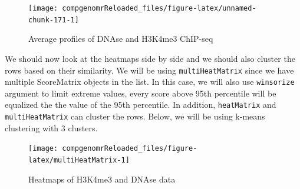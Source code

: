 \documentclass[12pt,]{krantz}
\newenvironment{Shaded}{\begin{snugshade}}{\end{snugshade}}
\newcommand{\ControlFlowTok}[1]{\textcolor[rgb]{0.13,0.29,0.53}{\textbf{#1}}}
\newcommand{\DataTypeTok}[1]{\textcolor[rgb]{0.13,0.29,0.53}{#1}}
\newcommand{\DecValTok}[1]{\textcolor[rgb]{0.00,0.00,0.81}{#1}}
\newcommand{\KeywordTok}[1]{\textcolor[rgb]{0.13,0.29,0.53}{\textbf{#1}}}
\newcommand{\NormalTok}[1]{#1}
\newcommand{\OperatorTok}[1]{\textcolor[rgb]{0.81,0.36,0.00}{\textbf{#1}}}
\newcommand{\OtherTok}[1]{\textcolor[rgb]{0.56,0.35,0.01}{#1}}
\newcommand{\StringTok}[1]{\textcolor[rgb]{0.31,0.60,0.02}{#1}}
\begin{document}
\begin{figure}

{\centering \texttt{[image: compgenomrReloaded\_files/figure-latex/unnamed-chunk-171-1]} 

}

\caption{Average profiles of DNAse and H3K4me3 ChIP-seq}\label{fig:unnamed-chunk-171}
\end{figure}

We should now look at the heatmaps side by side and we should also cluster the rows
based on their similarity. We will be using \texttt{multiHeatMatrix} since we have multiple ScoreMatrix objects in the list. In this case, we will also use \texttt{winsorize} argument to limit extreme values,
every score above 95th percentile will be equalized the the value of the 95th percentile. In addition, \texttt{heatMatrix} and \texttt{multiHeatMatrix} can cluster the rows.
Below, we will be using k-means clustering with 3 clusters.

\begin{Shaded}
\end{Shaded}

\begin{figure}

{\centering \texttt{[image: compgenomrReloaded\_files/figure-latex/multiHeatMatrix-1]} 

}

\caption{Heatmaps of H3K4me3 and DNAse data}\label{fig:multiHeatMatrix}
\end{figure}
\end{document}
